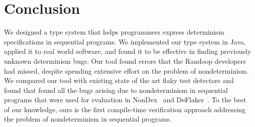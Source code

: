 \section{Conclusion}\label{sec:conclusion}

We designed a type system that helps programmers express determinism specifications
in sequential programs. 
We implemented our type system in Java, applied it to real world 
software, and found it to be effective in finding previously unknown determinism bugs. 
Our tool \theDeterminismChecker found errors that the
Randoop developers had missed, despite spending
extensive effort on the
problem of nondeterminism. We compared our tool with existing state of the art flaky test detectors
and found that \theDeterminismChecker found all the bugs arising due to nondeterminism
in sequential programs that were used for evaluation in NonDex~\cite{nondex} and DeFlaker~\cite{deflaker}.
To the best of our knowledge, ours is the
first compile-time verification approach addressing the problem of
nondeterminism in sequential programs.
